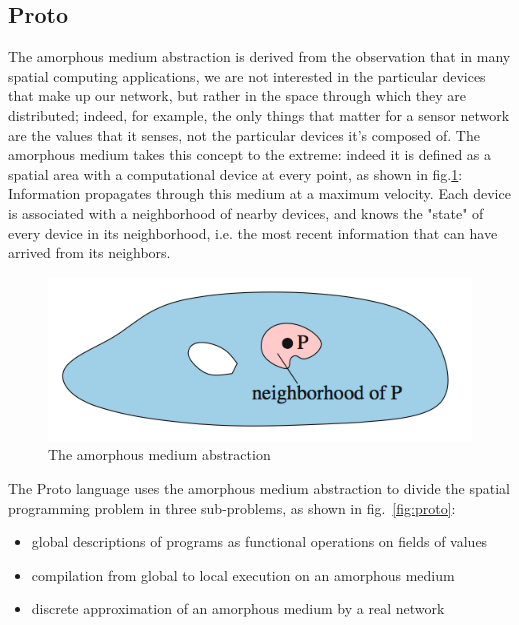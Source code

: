 \newpage

\subsection{Proto}\label{proto}

The amorphous medium abstraction\cite{medium} is derived from the observation that in many spatial computing applications, we are not interested in the particular devices that make up our network, but rather in the space through which they are distributed; indeed, for example, the only things that matter for a sensor network are the values that it senses, not the particular devices it's composed of.
The amorphous medium\cite{medium} takes this concept to the extreme: indeed it is defined as a spatial area with a computational device at every point, as shown in fig.\ref{fig:medium}: Information propagates through this medium at a maximum velocity. Each device is associated with a neighborhood of nearby devices, and knows the "state" of every device in its neighborhood, i.e. the most recent information that can have arrived from its neighbors.



\begin{figure}[H]
  \centering
  \includegraphics[width=\linewidth]{pictures/ProtoMedium.png}
  \caption{The amorphous medium abstraction}
  \label{fig:medium}
\end{figure}



The Proto\cite{proto} language uses the amorphous medium abstraction\cite{medium} to divide the spatial programming problem in three sub-problems, as shown in fig.~\ref{fig:proto}:

\begin{itemize}
\itemsep2pt
\item{
global descriptions of programs as functional operations on fields of values
}
\item{
compilation from global to local execution on an amorphous medium
}
\item{
discrete approximation of an amorphous medium by a real network
}
\end{itemize}


